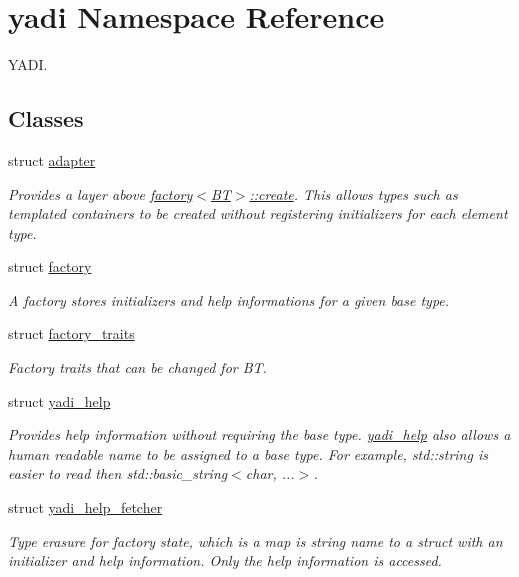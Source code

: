 \hypertarget{namespaceyadi}{}\section{yadi Namespace Reference}
\label{namespaceyadi}


Y\+A\+DI.  


\subsection*{Classes}
\begin{DoxyCompactItemize}
\item 
struct \hyperlink{structyadi_1_1adapter}{adapter}
\begin{DoxyCompactList}\small\item\em Provides a layer above \hyperlink{structyadi_1_1factory_a600474900d2c6fa5d09935a641298bd5}{factory$<$\+B\+T$>$\+::create}. This allows types such as templated containers to be created without registering initializers for each element type. \end{DoxyCompactList}\item 
struct \hyperlink{structyadi_1_1factory}{factory}
\begin{DoxyCompactList}\small\item\em A factory stores initializers and help informations for a given base type. \end{DoxyCompactList}\item 
struct \hyperlink{structyadi_1_1factory__traits}{factory\+\_\+traits}
\begin{DoxyCompactList}\small\item\em Factory traits that can be changed for BT. \end{DoxyCompactList}\item 
struct \hyperlink{structyadi_1_1yadi__help}{yadi\+\_\+help}
\begin{DoxyCompactList}\small\item\em Provides help information without requiring the base type. \hyperlink{structyadi_1_1yadi__help}{yadi\+\_\+help} also allows a human readable name to be assigned to a base type. For example, std\+::string is easier to read then std\+::basic\+\_\+string$<$char, ...$>$. \end{DoxyCompactList}\item 
struct \hyperlink{structyadi_1_1yadi__help__fetcher}{yadi\+\_\+help\+\_\+fetcher}
\begin{DoxyCompactList}\small\item\em Type erasure for factory state, which is a map is string name to a struct with an initializer and help information. Only the help information is accessed. \end{DoxyCompactList}\end{DoxyCompactItemize}
